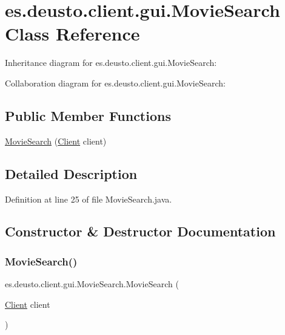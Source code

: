 \hypertarget{classes_1_1deusto_1_1client_1_1gui_1_1_movie_search}{}\section{es.\+deusto.\+client.\+gui.\+Movie\+Search Class Reference}
\label{classes_1_1deusto_1_1client_1_1gui_1_1_movie_search}


Inheritance diagram for es.\+deusto.\+client.\+gui.\+Movie\+Search\+:


Collaboration diagram for es.\+deusto.\+client.\+gui.\+Movie\+Search\+:
\subsection*{Public Member Functions}
\begin{DoxyCompactItemize}
\item 
\mbox{\hyperlink{classes_1_1deusto_1_1client_1_1gui_1_1_movie_search_a20d7badf9735287b4da03a9eb3cf09f4}{Movie\+Search}} (\mbox{\hyperlink{classes_1_1deusto_1_1client_1_1_client}{Client}} client)
\end{DoxyCompactItemize}


\subsection{Detailed Description}


Definition at line 25 of file Movie\+Search.\+java.



\subsection{Constructor \& Destructor Documentation}
\mbox{\label{classes_1_1deusto_1_1client_1_1gui_1_1_movie_search_a20d7badf9735287b4da03a9eb3cf09f4}} 
\subsubsection{\texorpdfstring{MovieSearch()}{MovieSearch()}}
{\footnotesize\ttfamily es.\+deusto.\+client.\+gui.\+Movie\+Search.\+Movie\+Search (\begin{DoxyParamCaption}\item[{\mbox{\hyperlink{classes_1_1deusto_1_1client_1_1_client}{Client}}}]{client }\end{DoxyParamCaption})}

